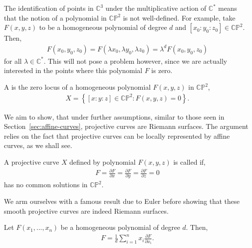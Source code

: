 The identification of points in $ \mathbb{C}^{3} $ under the multiplicative
action of $ \mathbb{C}^{*} $ means that the notion of a polynomial in $
	\mathbb{C}\mathbb{P}^{2} $ is not well-defined. For example, take $ F(x,y,z) $ to be a homogeneous polynomial
of degree $ d $ and $ [x_0:y_0:z_0] \in \mathbb{C}\mathbb{P}^{2} $. Then,
\begin{align*}
	F ( x_{0},y_{0},z_{0} ) = F(\lambda x_0, \lambda y_0, \lambda z_0) = \lambda^d
	F(x_0,y_0,z_0)
\end{align*}
for all $ \lambda \in \mathbb{C}^{*} $. This will not pose a problem however,
since we are actually interested in the points where this polynomial $ F $ is
zero.
\begin{definition}
	A  is the zero locus of a homogeneous polynomial $
		F(x,y,z) $ in $ \mathbb{C}\mathbb{P}^{2} $,
	\begin{align*}
		X = \left\{ [x:y:z] \in \mathbb{C}\mathbb{P}^{2}: F(x,y,z)=0 \right\}.
	\end{align*}
\end{definition}

We aim to show, that under further assumptions, similar to those seen in
Section~\ref{sec:affine-curves}, projective curves are Riemann surfaces. The
argument relies on the fact that projective curves can be locally represented by
affine curves, as we shall see.

\begin{definition}
	A projective curve $ X $ defined by polynomial $ F(x,y,z) $ is called
	 if,
	\begin{align*}
		F = \frac{\partial F}{\partial x} = \frac{\partial F}{\partial y} =
		\frac{\partial F}{\partial z} = 0
	\end{align*}
	has no common solutions in $ \mathbb{C}\mathbb{P}^{2} $.
\end{definition}

We arm ourselves with a famous result due to Euler before showing that these
smooth projective curves are indeed Riemann surfaces.

\begin{lemma}
	Let $ F(x_1,...,x_n) $ be a homogeneous polynomial of degree $ d $. Then,
	\begin{align*}
		F = \frac{1}{d}\sum_{i=1}^{n}{x_i \frac{\partial F}{\partial x_i}}.
	\end{align*}
\end{lemma}

